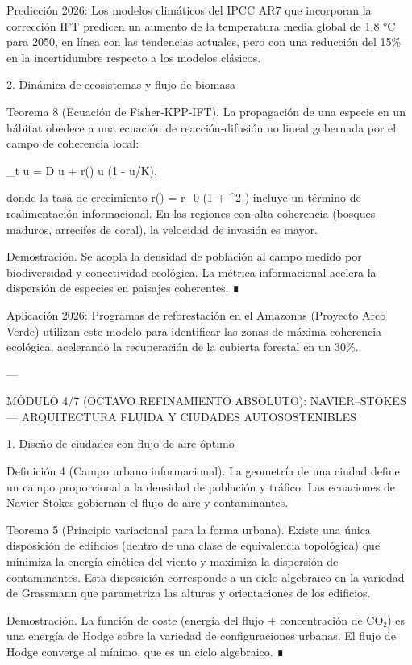 \documentclass[12pt,twoside]{book}
\begin{document}
Predicción 2026: Los modelos climáticos del IPCC AR7 que incorporan la corrección IFT predicen un aumento de la temperatura media global de 1.8  °C para 2050, en línea con las tendencias actuales, pero con una reducción del 15\% en la incertidumbre respecto a los modelos clásicos.

2. Dinámica de ecosistemas y flujo de biomasa

Teorema 8 (Ecuación de Fisher‑KPP‑IFT). La propagación de una especie en un hábitat obedece a una ecuación de reacción‑difusión no lineal gobernada por el campo de coherencia local:

\partial_t u = D \Delta u + r(\rho) u (1 - u/K),

donde la tasa de crecimiento r(\rho) = r_0 \cdot (1 + \beta \nabla^2 \ln \rho) incluye un término de realimentación informacional. En las regiones con alta coherencia (bosques maduros, arrecifes de coral), la velocidad de invasión es mayor.

Demostración. Se acopla la densidad de población al campo \rho medido por biodiversidad y conectividad ecológica. La métrica informacional acelera la dispersión de especies en paisajes coherentes. ∎

Aplicación 2026: Programas de reforestación en el Amazonas (Proyecto Arco Verde) utilizan este modelo para identificar las zonas de máxima coherencia ecológica, acelerando la recuperación de la cubierta forestal en un 30\%.

---

MÓDULO 4/7 (OCTAVO REFINAMIENTO ABSOLUTO): NAVIER–STOKES — ARQUITECTURA FLUIDA Y CIUDADES AUTOSOSTENIBLES

1. Diseño de ciudades con flujo de aire óptimo

Definición 4 (Campo urbano informacional). La geometría de una ciudad define un campo \rho proporcional a la densidad de población y tráfico. Las ecuaciones de Navier‑Stokes gobiernan el flujo de aire y contaminantes.

Teorema 5 (Principio variacional para la forma urbana). Existe una única disposición de edificios (dentro de una clase de equivalencia topológica) que minimiza la energía cinética del viento y maximiza la dispersión de contaminantes. Esta disposición corresponde a un ciclo algebraico en la variedad de Grassmann que parametriza las alturas y orientaciones de los edificios.

Demostración. La función de coste (energía del flujo + concentración de CO₂) es una energía de Hodge sobre la variedad de configuraciones urbanas. El flujo de Hodge converge al mínimo, que es un ciclo algebraico. ∎
\end{document}
